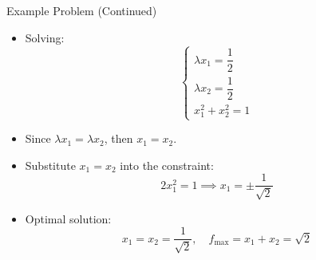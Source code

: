 \documentclass[serif, aspectratio=169]{beamer}
\begin{document}
\begin{frame}{Example Problem (Continued)}
\begin{itemize}
    \item Solving:
\[
\begin{cases}
\lambda x_1 = \dfrac{1}{2} \\
\lambda x_2 = \dfrac{1}{2} \\
x_1^2 + x_2^2 = 1
\end{cases}
\]
    \item Since \(\lambda x_1 = \lambda x_2\), then \(x_1 = x_2\).
    \item Substitute \(x_1 = x_2\) into the constraint:
    \[
2x_1^2 = 1 \implies x_1 = \pm \dfrac{1}{\sqrt{2}}
\]
    \item Optimal solution:
\[
x_1 = x_2 = \dfrac{1}{\sqrt{2}}, \quad f_{\text{max}} = x_1 + x_2 = \sqrt{2}
\]
\end{itemize}

\end{frame}



\end{document}
